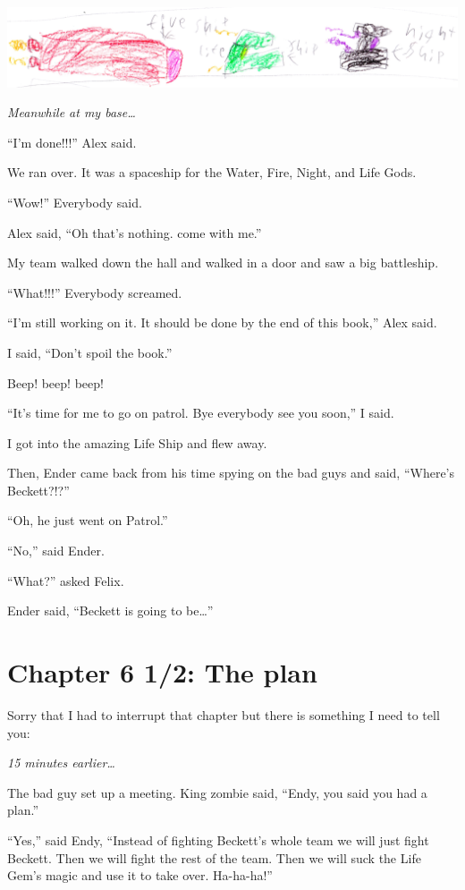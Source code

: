 \documentclass[12pt,oneside]{krantz}
\begin{document}
\includegraphics[width=6.25in,height=\textheight]{img/threeships.jpg}

\emph{Meanwhile at my base\ldots{}}

``I'm done!!!'' Alex said.

We ran over. It was a spaceship for the Water, Fire, Night, and Life
Gods.

``Wow!'' Everybody said.

Alex said, ``Oh that's nothing. come with me.''

My team walked down the hall and walked in a door and saw a big
battleship.

``What!!!'' Everybody screamed.

``I'm still working on it. It should be done by the end of this book,''
Alex said.

I said, ``Don't spoil the book.''

Beep! beep! beep!

``It's time for me to go on patrol. Bye everybody see you soon,'' I
said.

I got into the amazing Life Ship and flew away.

Then, Ender came back from his time spying on the bad guys and said,
``Where's Beckett?!?''

``Oh, he just went on Patrol.''

``No,'' said Ender.

``What?'' asked Felix.

Ender said, ``Beckett is going to be\ldots{}''

\hypertarget{chapter-6-12-the-plan}{%
\chapter*{Chapter 6 1/2: The plan}\label{chapter-6-12-the-plan}}


Sorry that I had to interrupt that chapter but there is something I need
to tell you:

\emph{15 minutes earlier\ldots{}}

The bad guy set up a meeting. King zombie said, ``Endy, you said you had
a plan.''

``Yes,'' said Endy, ``Instead of fighting Beckett's whole team we will
just fight Beckett. Then we will fight the rest of the team. Then we
will suck the Life Gem's magic and use it to take over. Ha-ha-ha!''
\end{document}
